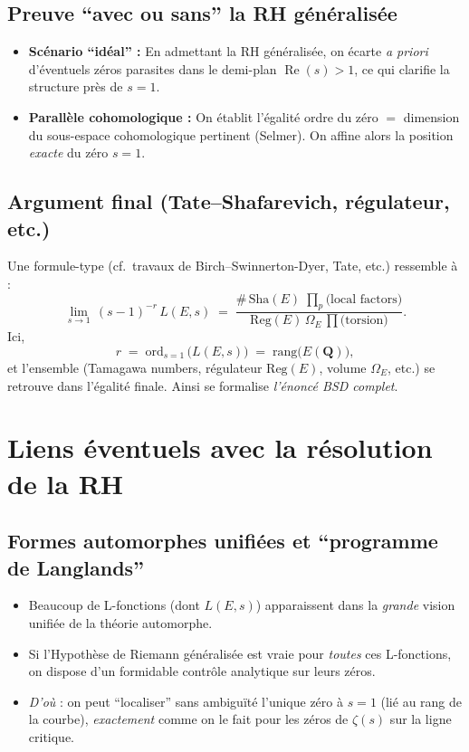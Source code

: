 \documentclass[11pt]{article}
\newcommand{\Sh}{\mathrm{Sha}}
\begin{document}
\subsection{Preuve “avec ou sans” la RH généralisée}
\begin{itemize}
  \item \textbf{Scénario “idéal” :} En admettant la RH généralisée, on écarte \emph{a priori} d'éventuels zéros parasites dans le demi-plan $\operatorname{Re}(s)>1$, ce qui clarifie la structure près de $s=1$.
  \item \textbf{Parallèle cohomologique :} On établit l'égalité ordre du zéro $=$ dimension du sous-espace cohomologique pertinent (Selmer). On affine alors la position \emph{exacte} du zéro $s=1$.
\end{itemize}

\subsection{Argument final (Tate--Shafarevich, régulateur, etc.)}
Une formule-type (cf.\ travaux de Birch--Swinnerton-Dyer, Tate, etc.) ressemble à :
\[
  \lim_{s\to 1} \,(s-1)^{-r}\,L(E,s)
  \;=\;
  \frac{\#\,\Sh(E)\;\prod_{p} \text{(local factors)}}{\mathrm{Reg}(E)\,\Omega_E\,\prod \text{(torsion)}}.
\]
Ici, 
\[
  r \;=\; \mathrm{ord}_{s=1}\,\bigl(L(E,s)\bigr) \;=\; \mathrm{rang}\bigl(E(\mathbf{Q})\bigr),
\]
et l'ensemble (Tamagawa numbers, régulateur $\mathrm{Reg}(E)$, volume $\Omega_E$, etc.) se retrouve dans l'égalité finale. Ainsi se formalise \emph{l'énoncé BSD complet}.

\section{Liens éventuels avec la résolution de la RH}

\subsection{Formes automorphes unifiées et “programme de Langlands”}
\begin{itemize}
  \item Beaucoup de L-fonctions (dont $L(E,s)$) apparaissent dans la \emph{grande} vision unifiée de la théorie automorphe. 
  \item Si l'Hypothèse de Riemann généralisée est vraie pour \emph{toutes} ces L-fonctions, on dispose d'un formidable contrôle analytique sur leurs zéros.
  \item \emph{D'où} : on peut ``localiser'' sans ambiguïté l'unique zéro à $s=1$ (lié au rang de la courbe), \emph{exactement} comme on le fait pour les zéros de $\zeta(s)$ sur la ligne critique.
\end{itemize}
\end{document}
